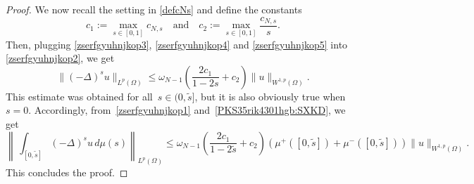 \documentclass[12pt,a4paper,intlimits,sumlimits]{amsart}
\def \R {\mathbb{R}}
\theoremstyle{definition}
\theoremstyle{plain}
\newtheorem{lemma}[definition]{Lemma}
\numberwithin{equation}{section}
\renewcommand{\leq}{\leqslant}
\renewcommand{\le}{\leqslant}
\begin{document}
\begin{proof}
We now recall the setting in \eqref{defcNs} and define the constants
\[
c_1:=\max_{s\in[0,1]}c_{N,s} \quad \mbox{and} \quad c_2:=\max_{s\in[0,1]}\frac{c_{N,s}}{s}.
\]
Then, plugging \eqref{zserfgyuhnjkop3}, \eqref{zserfgyuhnjkop4} and \eqref{zserfgyuhnjkop5} into \eqref{zserfgyuhnjkop2}, we get
\begin{equation}\label{PKS35rik4301hgb:SXKD}
\|(-\Delta)^s u\|_{L^p(\Omega)}\leq \omega_{N-1}\left(\frac{2c_1}{1-2s}+c_2\right)\|u\|_{W^{1,p}(\Omega)}.
\end{equation}This estimate was obtained for all~$s\in (0, \widetilde s]$, but it is also obviously true when~$s=0$.
Accordingly, from~\eqref{zserfgyuhnjkop1} and~\eqref{PKS35rik4301hgb:SXKD}, we get
\[
\left\|\,\int_{[0,\widetilde s]}(-\Delta)^s u\,d\mu(s) \right\|_{L^p(\Omega)}\leq \omega_{N-1}\left(\frac{2c_1}{1-2\widetilde s}+c_2\right)(\mu^+([0,\widetilde s])+\mu^-([0,\widetilde s]))\|u\|_{W^{1,p}(\Omega)}.
\]
This concludes the proof.
\end{proof}

\end{document}

